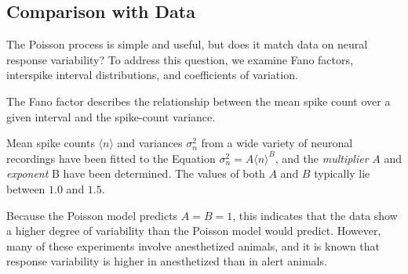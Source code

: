 \subsection{Comparison with Data}
\begin{rem}
    The Poisson process is simple and useful, but does it match data on neural response variability? To address this question,  we examine Fano factors, interspike interval distributions,  and coefficients of variation.
\end{rem}

\begin{rem}
  The Fano factor describes the relationship between the mean spike count over a given interval and the spike-count variance.
\end{rem}

\begin{rul}
  Mean spike counts $\langle n \rangle $ and variances $\sigma^2_n$ from a wide variety of neuronal recordings have been fitted to the Equation $\sigma^2_n = A\langle n\rangle^B $, and the \emph{multiplier} $A$ and \emph{exponent} B have been determined. The values of both $A$ and $B$ typically lie between 
  $1.0$ and $1.5.$
\end{rul}

\begin{rem}
    Because the Poisson model predicts $A = B = 1$, this indicates
that the data show a higher degree of variability than the Poisson model
would predict. However, many of these experiments involve anesthetized
animals, and it is known that response variability is higher in anesthetized
than in alert animals.
\end{rem}


